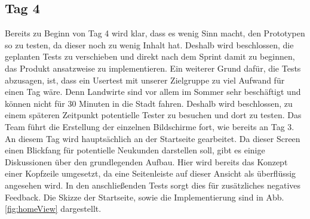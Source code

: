 \subsection*{\label{sec:Sprint-Umsetzung-Tag4}\thesubsection\quad Tag 4}Bereits zu Beginn von Tag 4 wird klar, dass es wenig Sinn macht, den Prototypen so zu testen, da dieser noch zu wenig Inhalt hat. Deshalb wird beschlossen, die geplanten Tests zu verschieben und direkt nach dem Sprint damit zu beginnen, das Produkt ansatzweise zu implementieren. Ein weiterer Grund dafür, die Tests abzusagen, ist, dass ein Usertest mit unserer Zielgruppe zu viel Aufwand für einen Tag wäre. Denn Landwirte sind vor allem im Sommer sehr beschäftigt und können nicht für 30 Minuten in die Stadt fahren. Deshalb wird beschlossen, zu einem späteren Zeitpunkt potentielle Tester zu besuchen und dort zu testen. Das Team führt die Erstellung der einzelnen Bildschirme fort, wie bereits an Tag 3. An diesem Tag wird hauptsächlich an der Startseite gearbeitet. Da dieser Screen einen Blickfang für potentielle Neukunden darstellen soll, gibt es einige Diskussionen über den grundlegenden Aufbau. Hier wird bereits das Konzept einer Kopfzeile umgesetzt, da eine Seitenleiste auf dieser Ansicht als überflüssig angesehen wird. In den anschließenden Tests sorgt dies für zusätzliches negatives Feedback. Die Skizze der Startseite, sowie die Implementierung sind in Abb. \ref{fig:homeView} dargestellt.

